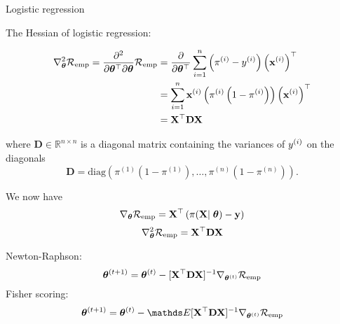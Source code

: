 \documentclass[11pt,compress,t,notes=noshow, xcolor=table]{beamer}
\begin{document}
\begin{vbframe}{Logistic regression}
\framebreak

The Hessian of logistic regression:

{\small
\begin{align*}
  \nabla^2_{\bm{\theta}}\mathcal{R}_{\text{emp}}  = \frac{\partial^2}{\partial{\bm{\theta}^\top}\partial\bm{\theta}}\mathcal{R}_{\text{emp}}  & =  
 \frac{\partial}{\partial{\bm{\theta}^\top}} \sum\limits_{i=1}^n \left(\pi^{(i)} - y^{(i)}\right)\left(\mathbf{x}^{(i)}\right)^\top\\
 & =  
  \sum^n_{i=1}\mathbf{x}^{(i)} \left(\pi^{(i)}\left(1-\pi^{(i)}\right)\right)\left(\mathbf{x}^{(i)}\right)^\top\\
  & =  
\mathbf{X}^\top \mathbf{D} \mathbf{X}\\
\end{align*}

where $\mathbf{D} \in \mathbb{R}^{n\times n}$ is a diagonal matrix containing the variances of $y^{(i)}$ on the diagonals 
$$\mathbf{D}=\text{diag}\left(\pi^{(1)}(1-\pi^{(1)}), \dots, \pi^{(n)}(1-\pi^{(n)})\right).$$
}

\framebreak
We now have
$$\nabla_{\bm{\theta}}\mathcal{R}_{\text{emp}} =  \mathbf{X}^\top\left(\pi(\mathbf{X}\vert\;\bm{\theta}) - \mathbf{y}\right) $$
$$\nabla^2_{\bm{\theta}}\mathcal{R}_{\text{emp}} =  \mathbf{X}^\top \mathbf{D} \mathbf{X}$$

\lz

Newton-Raphson: $$\bm{\theta}^{(t+1)}=\bm{\theta}^{(t)} - [\mathbf{X}^\top \mathbf{D} \mathbf{X}]^{-1}\nabla_{\bm{\theta}^{(t)}}\mathcal{R}_{\text{emp}} $$
Fisher scoring: $$\thetav^{(t+1)}=\thetav^{(t)} - \E[\mathbf{X}^\top \mathbf{D} \mathbf{X}]^{-1}\nabla_{\thetav^{(t)}}\riske $$
\end{vbframe}
\end{document}
